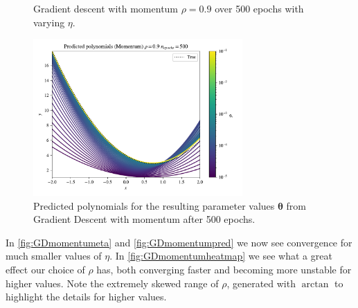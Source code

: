 \documentclass{article}
\theoremstyle{definition}
\begin{document}
\begin{figure}[H]%
    \centering
    \qquad
    \caption{Gradient descent with momentum $\rho=0.9$ over 500 epochs with varying $\eta$.}%
    \label{fig:GDmomentumeta}%
\end{figure}

\begin{figure}[H]%
    \centering
    \includegraphics[width=8cm]{Project2/figures/polynomial_grad/OLS_autodiff/momentum_prediction_eta.pdf}
    \caption{Predicted polynomials for the resulting parameter values $\boldsymbol{\theta}$ from Gradient Descent with momentum after 500 epochs.}
    \label{fig:GDmomentumpred}
\end{figure}

In \autoref{fig:GDmomentumeta} and \autoref{fig:GDmomentumpred} we now see convergence for much smaller values of $\eta$. In \autoref{fig:GDmomentumheatmap} we see what a great effect our choice of $\rho$ has, both converging faster and becoming more unstable for higher values. Note the extremely skewed range of $\rho$, generated with $\arctan$ to highlight the details for higher values.
\end{document}
